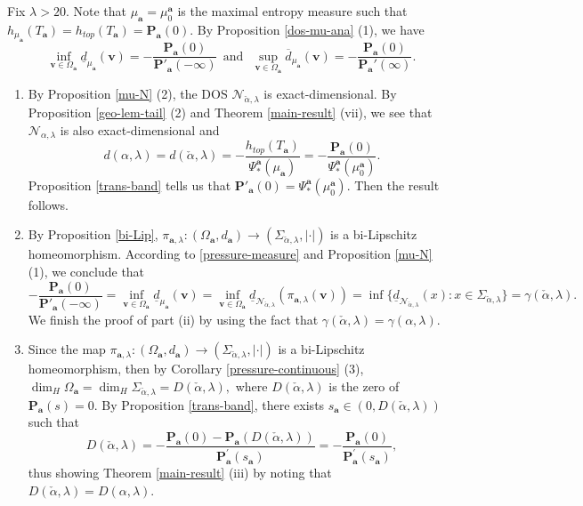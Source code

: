 \documentclass[reqno,11pt,graphicx,]{amsart}
\numberwithin{equation}{section}
\theoremstyle{plain}
\newcommand{\p}{\mathbf P}
\newcommand{\3}{\mathbf{3}}
\newcommand{\ma}{\mathbf{a}}
\newcommand{\mv}{\mathbf{v}}
\begin{document}
	Fix $\lambda>20$. Note that $\mu_{\ma}=\mu^{\ma}_0$ is the maximal entropy measure such that $h_{\mu_{\ma}}(T_{\ma})=h_{top}(T_{\ma})=\p_{\ma}(0)$. By Proposition \ref{dos-mu-ana} (1), we have
	\begin{equation}\label{pressure-measure}
		\inf_{\mv\in\Omega_{\ma}}\underline{d}_{\mu_{\ma}}(\mv)=-\frac{\p_{\ma}(0)}{\p'_{\ma}(-\infty)}\ \ \text{and}\ \ \ \sup_{\mv\in\Omega_{\ma}}\overline{d}_{\mu_{\ma}}(\mv)=-\frac{\p_{\ma}(0)}{\p_{\ma}'(\infty)}.
	\end{equation}
	\begin{enumerate}[label=(\roman*)]
		\item By Proposition \ref{mu-N} (2), the DOS $\mathcal{N}_{\check{\alpha},\lambda}$ is exact-dimensional. By Proposition \ref{geo-lem-tail} (2) and Theorem \ref{main-result} (vii), we see that $\mathcal{N}_{\alpha,\lambda}$ is also exact-dimensional and 
		\begin{equation*}
			d(\alpha,\lambda)=d(\check{\alpha},\lambda)=-\frac{h_{top}(T_{\ma})}{\Psi^{\ma}_*(\mu_{\ma})}
=-\frac{\p_{\ma}(0)}{\Psi^{\ma}_*(\mu^{\ma}_{0})}.
		\end{equation*}
		Proposition \ref{trans-band} tells us that $\p'_{\ma}(0)=\Psi^{\ma}_*(\mu^{\ma}_0)$. Then the result follows. %
		
		\item By Proposition \ref{bi-Lip}, $\pi_{\ma,\lambda}:(\Omega_{\mathbf{a}%
		},d_{\ma})\to(\Sigma_{\check{\alpha},\lambda},|\cdot|)$ is a bi-Lipschitz
		homeomorphism. According to \eqref{pressure-measure} and Proposition \ref{mu-N} (1), we conclude that
		\begin{equation*}
			-\frac{\p_{\ma}(0)}{\p'_{\ma}(-\infty)}=\inf_{\mv\in\Omega_{\ma}}\underline{d}_{\mu_{\ma}}(\mv)=\inf_{\mv\in\Omega_{\ma}}\underline{d}_{\mathcal{N}_{\check{\alpha},\lambda}}(\pi_{\ma,\lambda}(\mv))=\inf\{\underline{d}_{\mathcal{N}_{\check{\alpha},\lambda}}(x):x\in\Sigma_{\check{\alpha},\lambda}\}=\gamma(\check{\alpha},\lambda).
		\end{equation*}
		We finish the proof of part (ii) by using the fact that  $\gamma(\check{\alpha},\lambda)=\gamma(\alpha,\lambda)$.
		\item  Since the map $\pi_{\ma,\lambda}:(\Omega_{\mathbf{a}%
		},d_{\ma})\to(\Sigma_{\check{\alpha},\lambda},|\cdot|)$ is a bi-Lipschitz
		homeomorphism, then by Corollary \ref{pressure-continuous} (3), $\dim_H\Omega_{\ma}=\dim_H\Sigma_{\check{\alpha},\lambda}=D(\check{\alpha},\lambda),
		$
		where $D(\check{\alpha},\lambda)$ is the zero of $\p_{\ma}(s)=0$. By Proposition \ref{trans-band}, there exists $s_{\ma}\in(0,D(\check{\alpha},%
		\lambda))$ such that  
		\begin{equation*} \label{d-D-2}
			D(\check{\alpha},\lambda)=-\frac{\p_{\ma}(0)-\p_{\ma}(D(\check{\alpha},\lambda))} {\p_{\ma}^{\prime }(s_{\ma})}=-\frac{\p_{\ma}(0)}{\p^{\prime}_{\ma}(s_{\ma})},
		\end{equation*}
		thus showing Theorem \ref{main-result} (iii) by noting that $D(\check{\alpha},\lambda)=D(\alpha,\lambda)$.
		

\end{enumerate}
\end{document}
